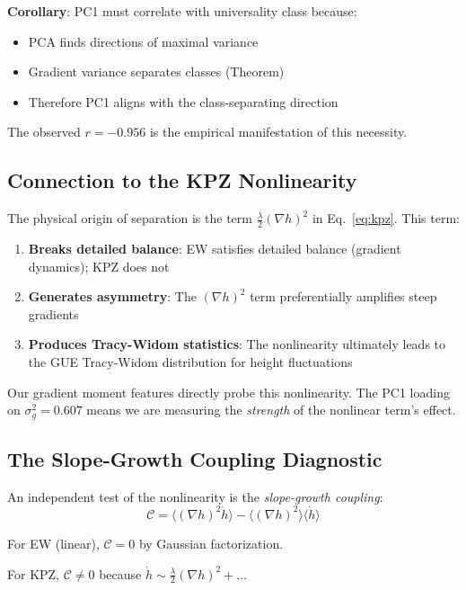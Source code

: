 \documentclass[aps,pre,twocolumn,superscriptaddress,showpacs,longbibliography]{revtex4-2}
\begin{document}
\textbf{Corollary}: PC1 must correlate with universality class because:
\begin{itemize}
\item PCA finds directions of maximal variance
\item Gradient variance separates classes (Theorem)
\item Therefore PC1 aligns with the class-separating direction
\end{itemize}

The observed $r = -0.956$ is the empirical manifestation of this necessity.

\subsection{Connection to the KPZ Nonlinearity}

The physical origin of separation is the term $\frac{\lambda}{2}(\nabla h)^2$ in Eq.~\eqref{eq:kpz}. This term:

\begin{enumerate}
\item \textbf{Breaks detailed balance}: EW satisfies detailed balance (gradient dynamics); KPZ does not
\item \textbf{Generates asymmetry}: The $(\nabla h)^2$ term preferentially amplifies steep gradients
\item \textbf{Produces Tracy-Widom statistics}: The nonlinearity ultimately leads to the GUE Tracy-Widom distribution for height fluctuations~\cite{Corwin2012}
\end{enumerate}

Our gradient moment features directly probe this nonlinearity. The PC1 loading on $\sigma_g^2 = 0.607$ means we are measuring the \emph{strength} of the nonlinear term's effect.

\subsection{The Slope-Growth Coupling Diagnostic}

An independent test of the nonlinearity is the \emph{slope-growth coupling}:
\begin{equation}
\mathcal{C} = \langle (\nabla h)^2 \dot{h} \rangle - \langle (\nabla h)^2 \rangle \langle \dot{h} \rangle
\label{eq:coupling}
\end{equation}

For EW (linear), $\mathcal{C} = 0$ by Gaussian factorization.

For KPZ, $\mathcal{C} \neq 0$ because $\dot{h} \sim \frac{\lambda}{2}(\nabla h)^2 + \ldots$
\end{document}
